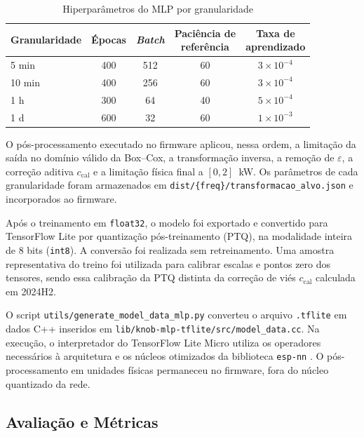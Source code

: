\begin{table}[htbp]
    \centering
    \caption{Hiperparâmetros do MLP por granularidade}
    \label{tab:hiperparametros}
    \small
    \begin{tabular}{lcccc}
        \toprule
        Granularidade & Épocas & \textit{Batch} &
        \shortstack{Paciência de\\referência} &
        \shortstack{Taxa de\\aprendizado} \\
        \midrule
        5 min  & 400 & 512 & 60 & $3\times10^{-4}$ \\
        10 min & 400 & 256 & 60 & $3\times10^{-4}$ \\
        1 h    & 300 & 64  & 40 & $5\times10^{-4}$ \\
        1 d    & 600 & 32  & 60 & $1\times10^{-3}$ \\
        \bottomrule
    \end{tabular}
\end{table}

O pós-processamento executado no firmware aplicou, nessa ordem, a limitação
da saída no domínio válido da Box--Cox, a transformação inversa, a remoção
de $\varepsilon$, a correção aditiva $c_{\mathrm{cal}}$ e a limitação física
final a $[0,2]$~kW. Os parâmetros de cada granularidade foram armazenados em
\texttt{dist/\{freq\}/transformacao\_alvo.json} e incorporados ao firmware.

Após o treinamento em \texttt{float32}, o modelo foi exportado e convertido
para TensorFlow Lite por quantização pós-treinamento (PTQ), na modalidade
inteira de 8 bits (\texttt{int8}). A conversão foi realizada sem
retreinamento. Uma amostra representativa do treino foi utilizada para
calibrar escalas e pontos zero dos tensores, sendo essa calibração da PTQ
distinta da correção de viés $c_{\mathrm{cal}}$ calculada em 2024H2.

O script \texttt{utils/generate\_model\_data\_mlp.py} converteu o arquivo
\texttt{.tflite} em dados C++ inseridos em
\texttt{lib/knob-mlp-tflite/src/model\_data.cc}. Na execução, o interpretador do
TensorFlow Lite Micro \cite{esptflitemicro2026,tflitemicro2024} utiliza os
operadores necessários à arquitetura e os núcleos otimizados da biblioteca
\texttt{esp-nn} \cite{espnn2026}. O pós-processamento em unidades físicas
permaneceu no firmware, fora do núcleo quantizado da rede.

\subsection{Avaliação e Métricas}

